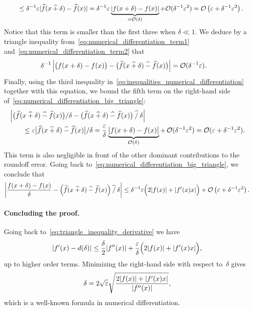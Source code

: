 \begin{solution}
\begin{align}
        \label{eq:numerical_differentiation_term2}
        &\qquad \leq \delta^{-1} \varepsilon \lvert\widehat f(x \mathbin{\widehat +} \delta) - \widehat f(x)\rvert 
        = \delta^{-1} \varepsilon  \underbrace{\lvert f(x + \delta) - f(x)\rvert}_{= \mathcal O(\delta)} +  \mathcal O (\delta^{-1} \varepsilon^2)
        = \mathcal O\left(\varepsilon + \delta^{-1} \varepsilon^2\right).
    \end{align}
    Notice that this term is smaller than the first three when $\delta \ll 1$.
    We deduce by a triangle inequality from~\eqref{eq:numerical_differentiation_term1} and~\eqref{eq:numerical_differentiation_term2} that
    \begin{align*}
        \label{eq:intermedia_numerical_derivative}
        \delta^{-1} \left\lvert \bigl( f(x + \delta) - f(x) \bigr)
        - \bigl( \widehat f(x \mathbin{\widehat +} \delta) \mathbin{\widehat -} \widehat f(x) \bigr) \right\rvert
        &= \mathcal O(\delta^{-1} \varepsilon).
    \end{align*}
    Finally, using the third inequality in~\eqref{eq:inequalities_numerical_differentiation} together with this equation,
    we bound the fifth term on the right-hand side of~\eqref{eq:numerical_differentiation_big_triangle}:
    \begin{align*}
        &\left\lvert \bigl( \widehat f(x \mathbin{\widehat +} \delta) \mathbin{\widehat -} \widehat f(x) \bigr) / \delta
        - \bigl( \widehat f(x \mathbin{\widehat +} \delta) \mathbin{\widehat -} \widehat f(x) \bigr) \mathbin{\widehat /} \delta \right\rvert \\
        &\qquad \leq \varepsilon \bigl\lvert  \widehat f(x \mathbin{\widehat +} \delta) \mathbin{\widehat -} \widehat f(x) \bigr \rvert / \delta
        = \frac{\varepsilon}{\delta} \underbrace{ \bigl\lvert  f(x + \delta) - f(x) \bigr \rvert }_{\mathcal O(\delta)}  
        +\, \mathcal O(\delta^{-1} \varepsilon^2) 
        = \mathcal O(\varepsilon + \delta^{-1} \varepsilon^2).
    \end{align*}
    This term is also negligible in front of the other dominant contributions to the roundoff error.
    Going back to~\eqref{eq:numerical_differentiation_big_triangle},
    we conclude that
    \[
        \left\lvert \frac{f(x + \delta) - f(x)}{\delta} - \Bigl(\widehat f(x \mathbin{\widehat +} \delta) \mathbin{\widehat -} \widehat f(x)\Bigr) \mathbin{\widehat /} \delta \right\rvert 
        \leq \delta^{-1} \varepsilon \Bigl( 2 \lvert f(x) \rvert + \lvert f'(x)x \rvert \Bigr) + \mathcal O\left(\varepsilon + \delta^{-1} \varepsilon^2\right).
    \]
    \paragraph{Concluding the proof.}
    Going back to~\eqref{eq:triangle_inequality_derivative} we have
    \[
        \lvert f'(x) - d(\delta) \rvert \leq \frac{\delta}{2} \lvert f''(x) \rvert + \frac{\varepsilon}{\delta} \Bigl( 2 \lvert f(x) \rvert + \lvert f'(x) x \rvert \Bigr),
    \]
    up to higher order terms.
    Minimizing the right-hand side with respect to~$\delta$ gives
    \[
        \delta = 2 \sqrt{\varepsilon} \sqrt{\frac{ 2 \lvert f(x) \rvert + \lvert f'(x) x \rvert }{\lvert f''(x)\rvert}},
    \]
    which is a well-known formula in numerical differentiation.
\end{solution}


